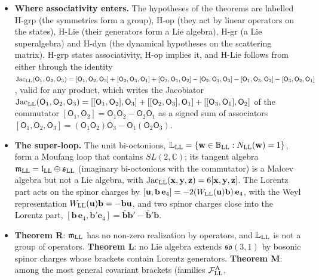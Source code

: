 \documentclass[
  10pt,
]{article}
\begin{document}
\begin{itemize}
\item
  \textbf{Where associativity enters.} The hypotheses of the theorems
  are labelled H-grp (the symmetries form a group), H-op (they act by
  linear operators on the states), H-Lie (their generators form a Lie
  algebra), H-gr (a Lie superalgebra) and H-dyn (the dynamical
  hypotheses on the scattering matrix). H-grp states associativity, H-op
  implies it, and H-Lie follows from either through the identity
  \(\mathrm{Jac}_{\rm LL}(\mathsf O_1,\mathsf O_2,\mathsf O_3)=[\mathsf O_1,\mathsf O_2,\mathsf O_3]+[\mathsf O_2,\mathsf O_3,\mathsf O_1]+[\mathsf O_3,\mathsf O_1,\mathsf O_2]-[\mathsf O_2,\mathsf O_1,\mathsf O_3]-[\mathsf O_1,\mathsf O_3,\mathsf O_2]-[\mathsf O_3,\mathsf O_2,\mathsf O_1]\),
  valid for any product, which writes the Jacobiator
  \(\mathrm{Jac}_{\rm LL}(\mathsf O_1,\mathsf O_2,\mathsf O_3)=[[\mathsf O_1,\mathsf O_2],\mathsf O_3]+[[\mathsf O_2,\mathsf O_3],\mathsf O_1]+[[\mathsf O_3,\mathsf O_1],\mathsf O_2]\)
  of the commutator
  \([\mathsf O_1,\mathsf O_2]=\mathsf O_1\mathsf O_2-\mathsf O_2\mathsf O_1\)
  as a signed sum of associators
  \([\mathsf O_1,\mathsf O_2,\mathsf O_3]=(\mathsf O_1\mathsf O_2)\mathsf O_3-\mathsf O_1(\mathsf O_2\mathsf O_3)\).
\item
  \textbf{The super-loop.} The unit bi-octonions,
  \(\mathbb L_{\rm LL}=\{\mathbf w\in\mathbb B_{\rm LL}:N_{\rm LL}(\mathbf w)=1\}\),
  form a Moufang loop that contains \(SL(2,\mathbb C)\); its tangent
  algebra
  \(\mathfrak m_{\rm LL}=\mathfrak l_{\rm LL}\oplus\mathfrak s_{\rm LL}\)
  (imaginary bi-octonions with the commutator) is a Malcev algebra but
  not a Lie algebra, with
  \(\mathrm{Jac}_{\rm LL}(\mathbf x,\mathbf y,\mathbf z)=6[\mathbf x,\mathbf y,\mathbf z]\).
  The Lorentz part acts on the spinor charges by
  \([\mathbf u,\mathbf b\,\mathbf e_4]=-2(W_{\rm LL}(\mathbf u)\mathbf b)\,\mathbf e_4\),
  with the Weyl representation
  \(W_{\rm LL}(\mathbf u)\mathbf b=-\mathbf b\mathbf u\), and two spinor
  charges close into the Lorentz part,
  \([\mathbf b\,\mathbf e_4,\mathbf b'\mathbf e_4]=\bar{\mathbf b}\mathbf b'-\bar{\mathbf b}'\mathbf b\).
\item
  \textbf{Theorem R}: \(\mathfrak m_{\rm LL}\) has no non-zero
  realization by operators, and \(\mathbb L_{\rm LL}\) is not a group of
  operators. \textbf{Theorem L}: no Lie algebra extends
  \(\mathfrak{so}(3,1)\) by bosonic spinor charges whose brackets
  contain Lorentz generators. \textbf{Theorem M}: among the most general
  covariant brackets (families \(\mathcal F^{\rm A}_{\rm LL}\),

\end{itemize}
\end{document}
